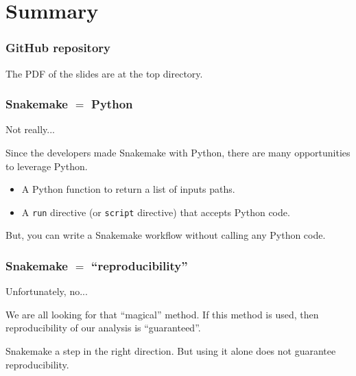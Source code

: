 \section{Summary}


\begin{frame}

\frametitle{GitHub repository}


The PDF of the slides are at the top directory.

\end{frame}


\begin{frame}

\frametitle{Snakemake $=$ Python}

{\red{$\rightarrow$}} Not really...
\vs

Since the developers made Snakemake with Python, there are many opportunities to leverage Python.
\begin{itemize}
  \item A Python function to return a list of inputs paths.
  \item A {\texttt{run}} directive (or {\texttt{script}} directive) that accepts Python code.
\end{itemize}
\vs

But, you can write a Snakemake workflow without calling any Python code.

\end{frame}


\begin{frame}

\frametitle{Snakemake $=$ ``reproducibility''}

{\red{$\rightarrow$}} Unfortunately, no...
\vs

We are all looking for that ``magical'' method.  If this method is used, then reproducibility of our analysis is ``guaranteed''.
\vs

Snakemake {} a step in the right direction.  But using it alone does not guarantee reproducibility.

\end{frame}


